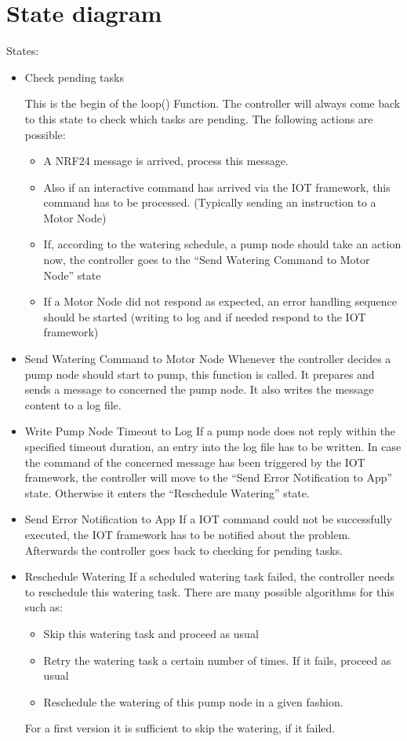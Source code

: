 \documentclass{article}
\begin{document}
\section{State diagram}

States:
\begin{itemize}
	\item Check pending tasks

		This is the begin of the loop() Function. The controller will always come back to this state to check which tasks are pending. The following actions are possible:

		\begin{itemize}
			\item A NRF24 message is arrived, process this message.
			\item Also if an interactive command has arrived via the IOT framework, this command has to be processed. (Typically sending an instruction to a Motor Node)
			\item If, according to the watering schedule, a pump node should take an action now, the controller goes to the ``Send Watering Command to Motor Node'' state
			\item If a Motor Node did not respond as expected, an error handling sequence should be started (writing to log and if needed respond to the IOT framework)
		\end{itemize}

	\item Send Watering Command to Motor Node
		Whenever the controller decides a pump node should start to pump, this function is called. 			It prepares and sends a message to concerned the pump node. It also writes the message content to a log file.
	\item Write Pump Node Timeout to Log
		If a pump node does not reply within the specified timeout duration, an entry into the log file has to be written. In case the command of the concerned message has been triggered by the IOT framework, the controller will move to the ``Send Error Notification to App'' state. Otherwise it enters the ``Reschedule Watering'' state.
	\item Send Error Notification to App
			If a IOT command could not be successfully executed, the IOT framework has to be notified about the problem. Afterwards the controller goes back to checking for pending tasks.
	\item Reschedule Watering
		If a scheduled watering task failed, the controller needs to reschedule this watering task.
		There are many possible algorithms for this such as:
		\begin{itemize}
			\item Skip this watering task and proceed as usual
			\item Retry the watering task a certain number of times. If it fails, proceed as usual
			\item Reschedule the watering of this pump node in a given fashion.
		\end{itemize}
		For a first version it is sufficient to skip the watering, if it failed.
		

\end{itemize}
\end{document}
